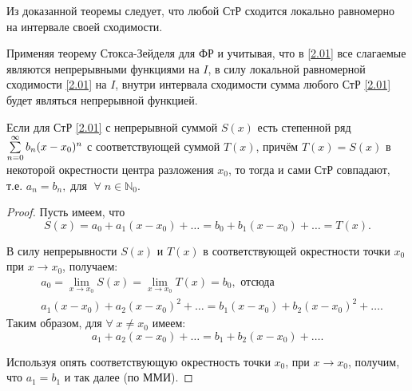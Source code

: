\begin{notes}
	\item Из доказанной теоремы следует, что любой СтР сходится локально равномерно на интервале своей сходимости.

	\item Применяя теорему Стокса-Зейделя для ФР и учитывая, что в \eqref{2.01} все слагаемые являются непрерывными функциями на $ I $,
	в силу локальной равномерной сходимости \eqref{2.01} на $ I $, внутри интервала сходимости сумма любого СтР \eqref{2.01}  будет являться непрерывной функцией.
\end{notes}
\begin{consequence}
	Если для СтР \eqref{2.01} с непрерывной суммой $ S(x) $ есть степенной ряд
	$ \sum\limits_{n=0}^{\infty} b_n (x-x_0)^n $ с соответствующей суммой $ T(x) $, причём $ T(x) = S(x) $ в некоторой окрестности центра разложения \nolinebreak$ x_0 $, то тогда и сами СтР совпадают,
	т.е. $ a_n = b_n, \; \text{для } \; \forall \; n \in \mathbb{N}_0 $.
\end{consequence}

\begin{proof} Пусть имеем, что
	\begin{equation*}
	S(x) = a_0 + a_1 (x-x_0) + \ldots = b_0 + b_1 (x-x_0) + \ldots = T(x).
	\end{equation*}

	В силу непрерывности $ S(x) $ и $ T(x) $ в соответствующей окрестности точки $ x_0 $ при
	$ x \to x_0 $, получаем:
	\begin{equation*}
	\begin{split}
	& a_0 = \lim\limits_{x\to x_0} S(x) = \lim\limits_{x\to x_0} T(x) = b_0, \text{ отсюда }\\
	& a_1 (x-x_0) + a_2(x-x_0)^2 + \ldots = b_1 (x-x_0) + b_2(x-x_0)^2 + \ldots.
	\end{split}
	\end{equation*}
	Таким образом, для $ \forall \; x \neq x_0 $ имеем:
	\begin{equation*}
	a_1 + a_2(x-x_0)  + \ldots =  b_1 + b_2(x-x_0) + \ldots.
	\end{equation*}

	Используя опять соответствующую окрестность точки $ x_0 $, при $ x \to x_0 $, получим, что
	$ a_1 = b_1 $ и так далее (по ММИ).
\end{proof}
